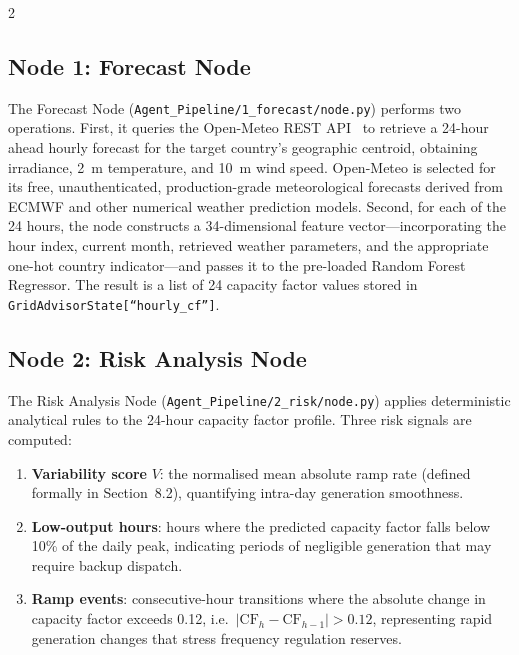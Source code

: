 \documentclass[11pt]{article}
\begin{document}
\begin{multicols}{2}

\subsection{Node 1: Forecast Node}

The Forecast Node (\texttt{Agent\_Pipeline/1\_forecast/node.py}) performs two
operations. First, it queries the Open-Meteo REST API~\cite{openmeteo2023} to
retrieve a 24-hour ahead hourly forecast for the target country's geographic
centroid, obtaining irradiance, 2~m temperature, and 10~m wind speed.
Open-Meteo is selected for its free, unauthenticated, production-grade
meteorological forecasts derived from ECMWF and other numerical weather
prediction models. Second, for each of the 24 hours, the node constructs a
34-dimensional feature vector---incorporating the hour index, current month,
retrieved weather parameters, and the appropriate one-hot country
indicator---and passes it to the pre-loaded Random Forest Regressor. The
result is a list of 24 capacity factor values stored in
\texttt{GridAdvisorState[``hourly\_cf'']}.

\subsection{Node 2: Risk Analysis Node}

The Risk Analysis Node (\texttt{Agent\_Pipeline/2\_risk/node.py}) applies
deterministic analytical rules to the 24-hour capacity factor profile. Three
risk signals are computed:

\begin{enumerate}
  \item \textbf{Variability score} $V$: the normalised mean absolute ramp rate
        (defined formally in Section~8.2), quantifying intra-day generation
        smoothness.
  \item \textbf{Low-output hours}: hours where the predicted capacity factor
        falls below 10\% of the daily peak, indicating periods of negligible
        generation that may require backup dispatch.
  \item \textbf{Ramp events}: consecutive-hour transitions where the absolute
        change in capacity factor exceeds 0.12, i.e.\
        $|\mathrm{CF}_h - \mathrm{CF}_{h-1}| > 0.12$, representing rapid
        generation changes that stress frequency regulation reserves.
\end{enumerate}


\end{multicols}
\end{document}

